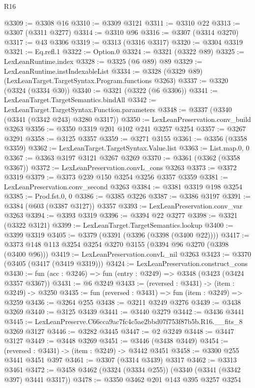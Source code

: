 \begin{lexlean}{R16}
\begin{coremodule}
@3309 := @3308 @16
@3310 := @3309 @3121
@3311 := @3310 @22
@3313 := @3307 (@3311 @3277)
@3314 := @3310 @96
@3316 := @3307 (@3314 @3270)
@3317 := @43 @3306
@3319 := @3313 (@3316 @3317)
@3320 := @3304 @3319
@3321 := Eq.refl.{1}
@3322 := Option.{0}
@3324 := @3321 (@3322 @89)
@3325 := LexLeanRuntime.index
@3328 := @3325 (@6 @89) @89
@3329 := LexLeanRuntime.instIndexableList
@3334 := @3328 (@3329 @89) (LexLeanTarget.TargetSyntax.Program.functions @3263)
@3337 := @3320 (@3324 (@3334 @30))
@3340 := @3321 (@3322 (@6 @3306))
@3341 := LexLeanTarget.TargetSemantics.bindAll
@3342 := LexLeanTarget.TargetSyntax.Function.parameters
@3348 := @3337 (@3340 (@3341 (@3342 @243) @3280 @3317))
@3350 := LexLeanPreservation.conv_build @3263
@3356 := @3350 @3319 @201 @102 @241 @3257 @3254
@3357 := @3267 @3291
@3358 := @3125 @3357
@3359 := @3271 @3155
@3361 := @3356 (@3358 @3359)
@3362 := LexLeanTarget.TargetSyntax.Value.list
@3363 := List.map.{0, 0}
@3367 := @3363 @3197 @3121 @3267 @3269
@3370 := @3361 (@3362 (@3358 @3367))
@3372 := LexLeanPreservation.convL_cons @3263
@3373 := @3372 @3319
@3379 := @3373 @239 @150 @3254 @3256 @3357 @3359
@3381 := LexLeanPreservation.conv_second @3263
@3384 := @3381 @3319 @198 @3254
@3385 := Prod.fst.{0, 0}
@3386 := @3385 @3226
@3387 := @3386 @3197
@3391 := @3384 (@603 (@3387 @3127)) @3357
@3393 := LexLeanPreservation.conv_var @3263
@3394 := @3393 @3319
@3396 := @3394 @22 @3277
@3398 := @3321 (@3322 @3121)
@3399 := LexLeanTarget.TargetSemantics.lookup
@3400 := @3399 @3319
@3405 := @3379 (@3391 (@3396 (@3398 (@3400 @22))))
@3417 := @3373 @148 @113 @3254 @3254 @3270 @3155 (@3394 @96 @3270 (@3398 (@3400 @96)))
@3419 := LexLeanPreservation.convL_nil @3263
@3423 := @3370 (@3405 (@3417 (@3419 @3319)))
@3424 := LexLeanPreservation.construct_cons
@3430 := fun (acc : @3246) => fun (entry : @3249) => @3348 (@3423 (@3424 @3357 @3367))
@3431 := @6 @3249
@3433 := (reversed : @3431) -> (item : @3249) -> @3250
@3435 := fun (reversed : @3431) => fun (item : @3249) => @3259
@3436 := @3264 @255
@3438 := @3211 @3249 @3276
@3439 := @3438 @3269
@3440 := @3125 @3439
@3441 := @3440 @3279
@3442 := @3436 @3441
@3445 := LexLeanPreserve.C66cca9ac7fc4c5ae2bbd07f753f87b5b.R16.__fits_8 @3269 @3127
@3446 := @3282 @3445
@3447 := @2 @3249
@3448 := @3447 @3127
@3449 := @3448 @3269
@3451 := @3446 (@3438 @3449)
@3454 := (reversed : @3431) -> (item : @3249) -> @3442 @3451
@3458 := @3300 @255 @3441 @3451 @397
@3461 := @3307 (@3314 @3439) @3317
@3462 := @3313 @3461
@3472 := @3458 @3462 (@3324 (@3334 @255)) (@3340 (@3341 (@3342 @397) @3441 @3317))
@3478 := @3350 @3462 @201 @143 @395 @3257 @3254

\end{coremodule}
\end{lexlean}
